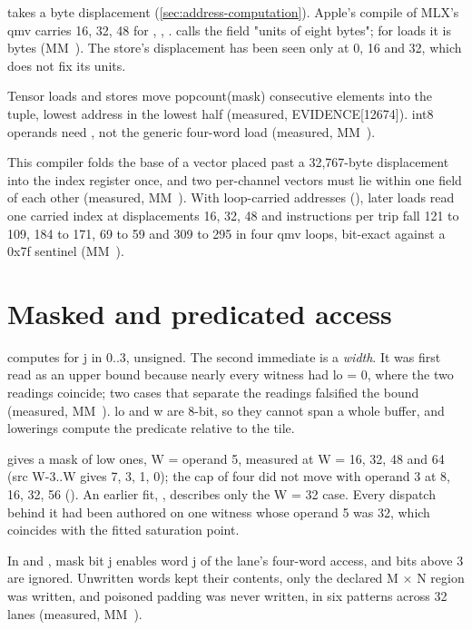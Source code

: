  takes a byte displacement (\cref{sec:address-computation}). Apple's compile of MLX's qmv carries 16, 32, 48 for
, , .  calls the field "units of eight bytes"; for loads it is
bytes (MM~). The store's displacement has been seen only at 0, 16 and 32, which does not fix its units.

Tensor loads and stores move popcount(mask) consecutive elements into the tuple, lowest address in the lowest half
(measured,  EVIDENCE{[}12674{]}). int8 operands need , not the
generic four-word load (measured, MM~).

This compiler folds the base of a vector placed past a 32,767-byte displacement into the index register once, and
two per-channel vectors must lie within one field of each other (measured, MM~). With loop-carried
addresses (), later loads read one carried index at displacements 16, 32, 48 and instructions per trip fall
121 to 109, 184 to 171, 69 to 59 and 309 to 295 in four qmv loops, bit-exact against a 0x7f sentinel (MM~).

\section{Masked and predicated access}\label{sec:masks-predicated-memory}

 computes  for j in 0..3, unsigned. The second
immediate is a \emph{width}. It was first read as an upper bound because nearly every witness had lo = 0, where the two
readings coincide; two cases that separate the readings falsified the bound (measured, MM~). lo and w are 8-bit, so they cannot
span a whole buffer, and lowerings compute the predicate relative to the tile.

 gives a mask of  low ones, W = operand 5, measured at
W = 16, 32, 48 and 64 (src W-3..W gives 7, 3, 1, 0); the cap of four did not move with operand 3 at 8, 16, 32, 56
(). An earlier fit, , describes only the W = 32 case.
Every dispatch behind it had been authored on one witness whose operand 5 was 32, which coincides with the fitted
saturation point.

In  and , mask bit j enables word j of the lane's
four-word access, and bits above 3 are ignored. Unwritten words kept their contents, only the declared M $\times$ N region was
written, and poisoned padding was never written, in six patterns across 32 lanes (measured, MM~).

